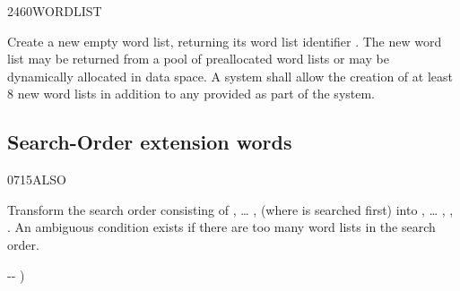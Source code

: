 \begin{worddef}{2460}{WORDLIST}
\item {}

	Create a new empty word list, returning its word list identifier
	. The new word list may be returned from a pool of
	preallocated word lists or may be dynamically allocated in data
	space. A system shall allow the creation of at least 8 new word
	lists in addition to any provided as part of the system.
\end{worddef}


\subsection{Search-Order extension words} %
\extended\vspace{1ex}

\begin{worddef}{0715}{ALSO}
\item \stack{}{}

	Transform the search order consisting of , {\ldots}
	,  (where  is searched
	first) into , {\ldots} , ,
	. An ambiguous condition exists if there are too
	many word lists in the search order.

	\begin{implement} %
		\word{:}   -{}- ) \\
		\tab {}     \\
		\word{;}
	\end{implement}

	\begin{testing} %
	\end{testing}
\end{worddef}

